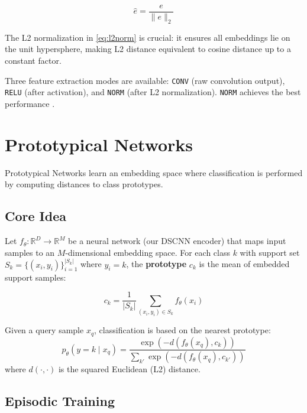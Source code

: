 \documentclass[12pt,a4paper]{report}
\begin{document}
\begin{equation}
    \hat{e} = \frac{e}{\|e\|_2}
    \label{eq:l2norm}
\end{equation}

The L2 normalization in \cref{eq:l2norm} is crucial: it ensures all
embeddings lie on the unit hypersphere, making L2 distance equivalent to
cosine distance up to a constant factor.

Three feature extraction modes are available: \texttt{CONV} (raw convolution
output), \texttt{RELU} (after activation), and \texttt{NORM} (after L2
normalization). \texttt{NORM} achieves the best performance \cite{rusci2023}.


\section{Prototypical Networks}
\label{sec:protonet}

Prototypical Networks \cite{snell2017prototypical} learn an embedding space
where classification is performed by computing distances to class prototypes.

\subsection{Core Idea}

Let $f_\theta : \mathbb{R}^D \rightarrow \mathbb{R}^M$ be a neural network
(our DSCNN encoder) that maps input samples to an $M$-dimensional embedding
space. For each class $k$ with support set
$S_k = \{(x_i, y_i)\}_{i=1}^{|S_k|}$ where $y_i = k$, the
\textbf{prototype} $c_k$ is the mean of embedded support samples:

\begin{equation}
    c_k = \frac{1}{|S_k|} \sum_{(x_i, y_i) \in S_k} f_\theta(x_i)
    \label{eq:prototype}
\end{equation}

Given a query sample $x_q$, classification is based on the nearest prototype:
\begin{equation}
    p_\theta(y = k \mid x_q) =
    \frac{\exp(-d(f_\theta(x_q), c_k))}
         {\sum_{k'} \exp(-d(f_\theta(x_q), c_{k'}))}
    \label{eq:proto_softmax}
\end{equation}
where $d(\cdot, \cdot)$ is the squared Euclidean (L2) distance.

\subsection{Episodic Training}
\end{document}
